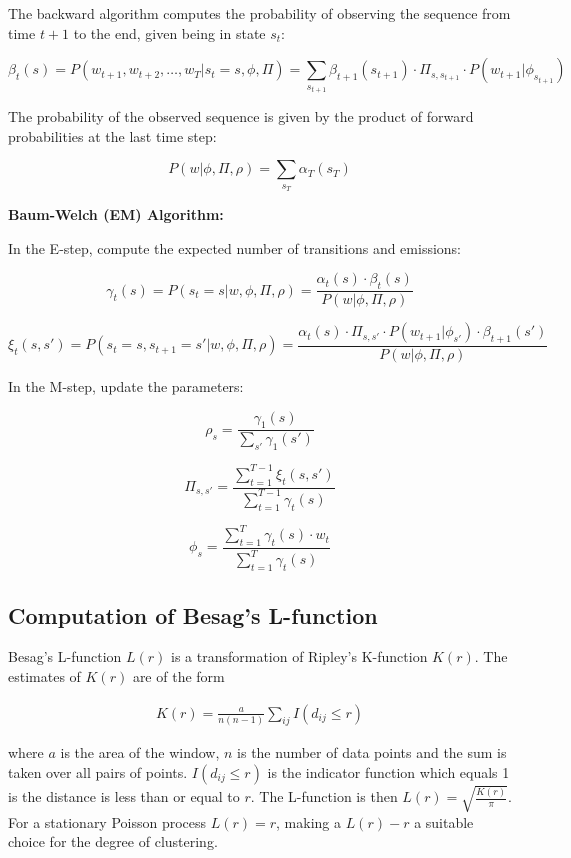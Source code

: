 \documentclass{ucetd}
\begin{document}
The backward algorithm computes the probability of observing the sequence from time \(t+1\) to the end, given being in state \(s_t\):

\[
\beta_t(s) = P(w_{t+1}, w_{t+2}, \ldots, w_T | s_t = s, \phi, \Pi) = \sum_{s_{t+1}} \beta_{t+1}(s_{t+1}) \cdot \Pi_{s, s_{t+1}} \cdot P(w_{t+1} | \phi_{s_{t+1}})
\]

The probability of the observed sequence is given by the product of forward probabilities at the last time step:

\[
P(w | \phi, \Pi, \rho) = \sum_{s_T} \alpha_T(s_T)
\]

\textbf{Baum-Welch (EM) Algorithm:}

In the E-step, compute the expected number of transitions and emissions:

\[
\gamma_t(s) = P(s_t = s | w, \phi, \Pi, \rho) = \frac{\alpha_t(s) \cdot \beta_t(s)}{P(w | \phi, \Pi, \rho)}
\]

\[
\xi_t(s, s') = P(s_t = s, s_{t+1} = s' | w, \phi, \Pi, \rho) = \frac{\alpha_t(s) \cdot \Pi_{s, s'} \cdot P(w_{t+1} | \phi_{s'}) \cdot \beta_{t+1}(s')}{P(w | \phi, \Pi, \rho)}
\]

In the M-step, update the parameters:

\[
\rho_s = \frac{\gamma_1(s)}{\sum_{s'} \gamma_1(s')}
\]

\[
\Pi_{s, s'} = \frac{\sum_{t=1}^{T-1} \xi_t(s, s')}{\sum_{t=1}^{T-1} \gamma_t(s)}
\]

\[
\phi_s = \frac{\sum_{t=1}^{T} \gamma_t(s) \cdot w_t}{\sum_{t=1}^{T} \gamma_t(s)}
\]



\subsection{Computation of Besag's L-function}

Besag's L-function $L(r)$ is a transformation of Ripley's K-function $K(r)$. The estimates of $K(r)$ are of the form 

\begin{align*}
K(r) = \frac{a}{n(n-1)}\sum_{ij} I(d_{ij}\leq r)
\end{align*}

where $a$ is the area of the window, $n$ is the number of data points and the sum is taken over all pairs of points. $I(d_{ij}\leq r)$ is the indicator function which equals 1 is the distance is less than or equal to $r$. The L-function is then $L(r) = \sqrt{\frac{K(r)}{\pi}}$. For a stationary Poisson process $L(r) = r$, making a $L(r)-r$ a suitable choice for the degree of clustering.
\end{document}
